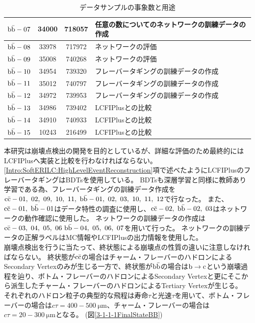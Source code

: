 \begin{table}[htb]
\begin{tabular}{c c c l}
    $\rm b\bar{b}-07$ & 34000 & 718057 & 任意の数についてのネットワークの訓練データの作成\\ \hline
    $\rm b\bar{b}-08$ & 33978 & 717972 & ネットワークの評価\\ 
    $\rm b\bar{b}-09$ & 35008 & 740268 & ネットワークの評価\\ \hline
    $\rm b\bar{b}-10$ & 34954 & 739320 & フレーバータギングの訓練データの作成\\ 
    $\rm b\bar{b}-11$ & 35012 & 740797 & フレーバータギングの訓練データの作成\\ 
    $\rm b\bar{b}-12$ & 34972 & 739953 & フレーバータギングの訓練データの作成\\ \hline
    $\rm b\bar{b}-13$ & 34986 & 739402 & LCFIPlusとの比較\\ 
    $\rm b\bar{b}-14$ & 34910 & 740933 & LCFIPlusとの比較\\ 
    $\rm b\bar{b}-15$ & 10243 & 216499 & LCFIPlusとの比較\\ \hline
  \end{tabular}
  \caption{データサンプルの事象数と用途}
  \label{DataSamples}
\end{table}

本研究は崩壊点検出の開発を目的としているが、詳細な評価のため最終的にはLCFIPlusへ実装と比較を行わなければならない。
\ref{Intro:SoftERILC:HighLevelEventReconstruction}項で述べたようにLCFIPlusのフレーバータギングはBDTsを使用している。
BDTsも深層学習と同様に教師あり学習である為、フレーバータギングの訓練データ作成を$\rm c\bar{c}-01,\ 02,\ 09,\ 10,\ 11,\ \rm b\bar{b}-01,\ 02,\ 03,\ 10,\ 11,\ 12$で行なった。
また、$\rm c\bar{c}-01,\ b\bar{b}-01$はデータ特性の調査に使用し、$\rm c\bar{c}-02,\ b\bar{b}-02,\ 03$はネットワークの動作確認に使用した。
ネットワークの訓練データの作成は$\rm c\bar{c}-03,\ 04,\ 05,\ 06\ b\bar{b}-04,\ 05,\ 06,\ 07$を用いて行った。
ネットワークの訓練データの正解ラベルはMC情報やLCFIPlusの出力情報を使用した。\\

崩壊点検出を行うに当たって、終状態による崩壊点の性質の違いに注意しなければならない。
終状態が$\rm c\bar{c}$の場合はチャーム・フレーバーのハドロンによるSecondary Vertexのみが生じる一方で、終状態が$\rm b\bar{b}$の場合は$\rm b \to c$という崩壊過程を辿り、ボトム・フレーバーのハドロンによるSecondary Vertexと更にそこから派生したチャーム・フレーバーのハドロンによるTertiary Vertexが生じる。
それぞれのハドロン粒子の典型的な飛程は寿命$\tau$と光速$\tau$を用いて、ボトム・フレーバーの場合は$c \tau = 400-500 \ \mathrm{\mu m}$、チャーム・フレーバーの場合は$c \tau = 20-300 \ \mathrm{\mu m}$となる。 (図\ref{3-1-1-1FinalStateBB})


